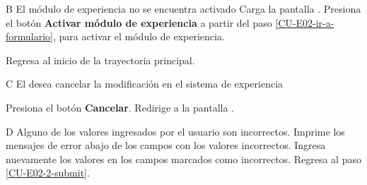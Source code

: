 \begin{UCtrayectoriaA}{B}{
El módulo de experiencia no se encuentra activado}
  \Sistema Carga la pantalla .
  \Actor Presiona el botón {\bf Activar módulo de experiencia}
   a partir del paso \ref{CU-E02-ir-a-formulario},
                     para activar el módulo de experiencia.

  \Sistema Regresa al inicio de la trayectoria principal.

\end{UCtrayectoriaA}

\begin{UCtrayectoriaA}{C}{
El  desea cancelar la modificación en el sistema de
experiencia}

  \Actor Presiona el botón {\bf Cancelar}.
  \Sistema Redirige a la pantalla .
\end{UCtrayectoriaA}

\begin{UCtrayectoriaA}{D}{
Alguno de los valores ingresados por el usuario son incorrectos.}
  \Sistema Imprime los mensajes de error abajo de los campos con los valores
           incorrectos.
  \Actor Ingresa nuevamente los valores en los campos marcados como incorrectos.
  \Sistema Regresa al paso \ref{CU-E02-2-submit}.

\end{UCtrayectoriaA}
